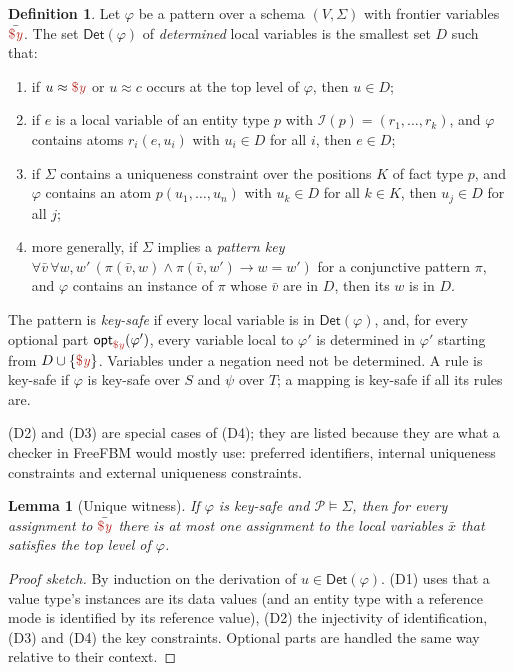 \documentclass[11pt]{amsart}
\newtheorem{lemma}[theorem]{Lemma}
\theoremstyle{definition}
\newtheorem{definition}{Definition}
\theoremstyle{remark}
\newcommand{\pop}{\mathcal{P}}
\newcommand{\dataEq}{\mathrel{\approx}}
\newcommand{\fv}[1]{\textcolor{BrickRed}{\$\mathit{#1}}}
\newcommand{\Opt}[1]{\mathsf{opt}_{#1}}
\newcommand{\IdSchemes}{\mathcal{I}}
\newcommand{\Det}{\mathsf{Det}}
\begin{document}
\begin{definition}
Let $\varphi$ be a pattern over a schema $(V, \Sigma)$ with frontier
variables $\bar{\fv{y}}$. The set $\Det(\varphi)$ of \emph{determined}
local variables is the smallest set $D$ such that:
\begin{enumerate}
  \item[(D1)] if $u \dataEq \fv{y}$ or $u \dataEq c$ occurs at the top level
    of $\varphi$, then $u \in D$;
  \item[(D2)] if $e$ is a local variable of an entity type $p$ with
    $\IdSchemes(p) = (r_1, \ldots, r_k)$, and $\varphi$ contains atoms
    $r_i(e, u_i)$ with $u_i \in D$ for all $i$, then $e \in D$;
  \item[(D3)] if $\Sigma$ contains a uniqueness constraint over the
    positions $K$ of fact type $p$, and $\varphi$ contains an atom $p(u_1,
    \ldots, u_n)$ with $u_k \in D$ for all $k \in K$, then $u_j \in D$ for
    all $j$;
  \item[(D4)] more generally, if $\Sigma$ implies a \emph{pattern key}
    $\forall \bar v\, \forall w, w'\, (\pi(\bar v, w) \wedge \pi(\bar v, w')
    \to w = w')$ for a conjunctive pattern $\pi$, and $\varphi$ contains an
    instance of $\pi$ whose $\bar v$ are in $D$, then its $w$ is in $D$.
\end{enumerate}
The pattern is \emph{key-safe} if every local variable is in
$\Det(\varphi)$, and, for every optional part $\Opt{\fv{y}}(\varphi')$,
every variable local to $\varphi'$ is determined in $\varphi'$ starting
from $D \cup \{ \fv{y} \}$. Variables under a negation need not be
determined. A rule is key-safe if $\varphi$ is key-safe over $S$ and $\psi$
over $T$; a mapping is key-safe if all its rules are.
\end{definition}

(D2) and (D3) are special cases of (D4); they are listed because they are
what a checker in FreeFBM would mostly use: preferred identifiers, internal
uniqueness constraints and external uniqueness constraints.

\begin{lemma}[Unique witness]
If $\varphi$ is key-safe and $\pop \models \Sigma$, then for every
assignment to $\bar{\fv{y}}$ there is at most one assignment to the local
variables $\bar x$ that satisfies the top level of $\varphi$.
\end{lemma}

\begin{proof}[Proof sketch]
By induction on the derivation of $u \in \Det(\varphi)$. (D1) uses that
a value type's instances are its data values (and an entity type with a
reference mode is identified by its reference value), (D2) the injectivity of
identification, (D3) and (D4) the key constraints. Optional parts are
handled the same way relative to their context.
\end{proof}
\end{document}

